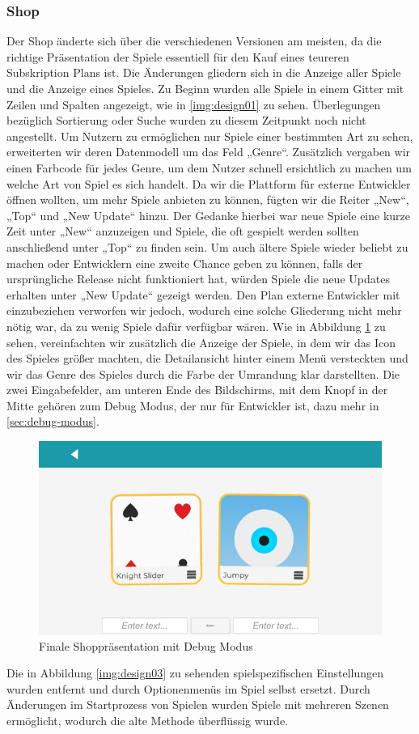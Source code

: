 \subsubsection{Shop} \label{sec:shop}
Der Shop änderte sich über die verschiedenen Versionen am meisten, da die richtige Präsentation der Spiele essentiell für den Kauf eines teureren Subskription Plans ist. Die Änderungen gliedern sich in die Anzeige aller Spiele und die Anzeige eines Spieles.
\newline
Zu Beginn wurden alle Spiele in einem Gitter mit Zeilen und Spalten angezeigt, wie in \ref{img:design01} zu sehen. Überlegungen bezüglich Sortierung oder Suche wurden zu diesem Zeitpunkt noch nicht angestellt. Um Nutzern zu ermöglichen nur Spiele einer bestimmten Art zu sehen, erweiterten wir deren Datenmodell um das Feld „Genre“. Zusätzlich vergaben wir einen Farbcode für jedes Genre, um dem Nutzer schnell ersichtlich zu machen um welche Art von Spiel es sich handelt. Da wir die Plattform für externe Entwickler öffnen wollten, um mehr Spiele anbieten zu können, fügten wir die Reiter „New“, „Top“ und „New Update“ hinzu. Der Gedanke hierbei war neue Spiele eine kurze Zeit unter  „New“ anzuzeigen und Spiele, die oft gespielt werden sollten anschließend unter „Top“ zu finden sein. Um auch ältere Spiele wieder beliebt zu machen oder Entwicklern eine zweite Chance geben zu können, falls der ursprüngliche Release nicht funktioniert hat, würden Spiele die neue Updates erhalten unter „New Update“ gezeigt werden. Den Plan externe Entwickler mit einzubeziehen verworfen wir jedoch, wodurch eine solche Gliederung nicht mehr nötig war, da zu wenig Spiele dafür verfügbar wären. Wie in Abbildung \ref{img:design07} zu sehen, vereinfachten wir zusätzlich die Anzeige der Spiele, in dem wir das Icon des Spieles größer machten, die Detailansicht hinter einem Menü versteckten und wir das Genre des Spieles durch die Farbe der Umrandung klar darstellten. Die zwei Eingabefelder, am unteren Ende des Bildschirms, mit dem Knopf in der Mitte gehören zum Debug Modus, der nur für Entwickler ist, dazu mehr in \ref{sec:debug-modus}.
\begin{center}
    \begin{figure}
        \includegraphics[scale=0.7]{images/design07.png} 
        \caption{Finale Shoppräsentation mit Debug Modus}
        \label{img:design07}
    \end{figure}
\end{center}
Die in Abbildung \ref{img:design03} zu sehenden spielspezifischen Einstellungen wurden entfernt und durch Optionenmenüs im Spiel selbst ersetzt. Durch Änderungen im Startprozess von Spielen wurden Spiele mit mehreren Szenen ermöglicht, wodurch die alte Methode überflüssig wurde.
